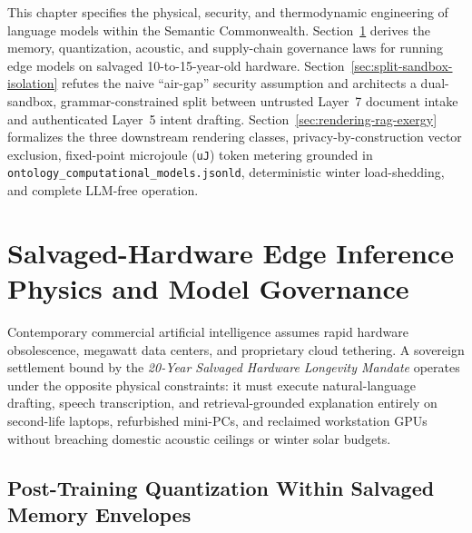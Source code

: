 This chapter specifies the physical, security, and thermodynamic engineering of language models within the Semantic Commonwealth. Section~\ref{sec:salvaged-edge-inference} derives the memory, quantization, acoustic, and supply-chain governance laws for running edge models on salvaged 10-to-15-year-old hardware. Section~\ref{sec:split-sandbox-isolation} refutes the naive ``air-gap'' security assumption and architects a dual-sandbox, grammar-constrained split between untrusted Layer~7 document intake and authenticated Layer~5 intent drafting. Section~\ref{sec:rendering-rag-exergy} formalizes the three downstream rendering classes, privacy-by-construction vector exclusion, fixed-point microjoule (\texttt{uJ}) token metering grounded in \texttt{ontology\_computational\_models.jsonld}, deterministic winter load-shedding, and complete LLM-free operation.

\section{Salvaged-Hardware Edge Inference Physics and Model Governance}
\label{sec:salvaged-edge-inference}

Contemporary commercial artificial intelligence assumes rapid hardware obsolescence, megawatt data centers, and proprietary cloud tethering. A sovereign settlement bound by the \emph{20-Year Salvaged Hardware Longevity Mandate} operates under the opposite physical constraints: it must execute natural-language drafting, speech transcription, and retrieval-grounded explanation entirely on second-life laptops, refurbished mini-PCs, and reclaimed workstation GPUs without breaching domestic acoustic ceilings or winter solar budgets.

\subsection{Post-Training Quantization Within Salvaged Memory Envelopes}
\label{subsec:ptq-memory-physics}


